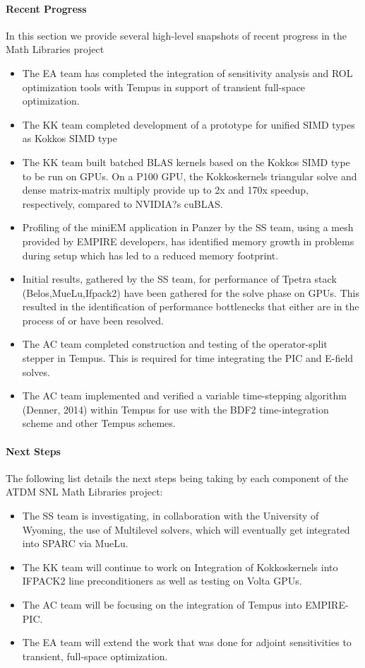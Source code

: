\paragraph{Recent Progress}
In this section we provide several high-level snapshots of recent progress in the Math Libraries project
\begin{itemize}
\item The EA team has completed the integration of sensitivity analysis and ROL optimization tools with Tempus in support of transient full-space optimization.
\item The KK team completed development of a prototype for unified SIMD types as Kokkos SIMD type
\item The KK team built batched BLAS kernels based on the Kokkos SIMD type to be run on GPUs. On a P100 GPU, the Kokkoskernels triangular solve and dense matrix-matrix multiply provide up to 2x and 170x speedup, respectively, compared to NVIDIA?s cuBLAS.
\item Profiling of the miniEM application in Panzer by the SS team, using a mesh provided by EMPIRE developers, has identified memory growth in problems during setup which has led to a reduced memory footprint.
\item Initial results, gathered by the SS team, for performance of Tpetra stack (Belos,MueLu,Ifpack2) have been gathered for the solve phase on GPUs. This resulted in the identification of performance bottlenecks that either are in the process of or have been resolved.
\item The AC team completed construction and testing of the operator-split stepper in Tempus. This is required for time integrating the PIC and E-field solves.
\item The AC team implemented and verified a variable time-stepping algorithm (Denner, 2014) within Tempus for use with the BDF2 time-integration scheme and other Tempus schemes. 
\end{itemize}

\paragraph{Next Steps}
The following list details the next steps being taking by each component of the ATDM SNL Math Libraries project:

\begin{itemize}
\item The SS team is investigating, in collaboration with the University of Wyoming, the use of Multilevel solvers, which will eventually get integrated into SPARC via MueLu.
\item The KK team will continue to work on Integration of Kokkoskernels into IFPACK2 line preconditioners as well as testing on Volta GPUs.
\item The AC team will be focusing on the integration of Tempus into EMPIRE-PIC.
\item The EA team will extend the work that was done for adjoint sensitivities to transient, full-space optimization.

\end{itemize}